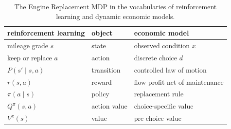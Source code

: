 \begin{table}[h]
\centering
\caption{The Engine Replacement MDP in the vocabularies of reinforcement learning and dynamic economic models.}
\label{tab:engine_dictionary}
\begin{tabular}{@{}lll@{}}
\hline
reinforcement learning & object & economic model \\
\hline
mileage grade $s$ & state & observed condition $x$ \\
keep or replace $a$ & action & discrete choice $d$ \\
$P(s'\mid s,a)$ & transition & controlled law of motion \\
$r(s,a)$ & reward & flow profit net of maintenance \\
$\pi(a\mid s)$ & policy & replacement rule \\
$Q^\pi(s,a)$ & action value & choice-specific value \\
$V^\pi(s)$ & value & pre-choice value \\
\hline
\end{tabular}
\end{table}
